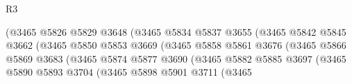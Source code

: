\begin{lexlean}{R3}
\begin{coremodule}
                                                (@3465
                                                  @5826
                                                  @5829
                                                  @3648
                                                  (@3465
                                                    @5834
                                                    @5837
                                                    @3655
                                                    (@3465
                                                      @5842
                                                      @5845
                                                      @3662
                                                      (@3465
                                                        @5850
                                                        @5853
                                                        @3669
                                                        (@3465
                                                          @5858
                                                          @5861
                                                          @3676
                                                          (@3465
                                                            @5866
                                                            @5869
                                                            @3683
                                                            (@3465
                                                              @5874
                                                              @5877
                                                              @3690
                                                              (@3465
                                                                @5882
                                                                @5885
                                                                @3697
                                                                (@3465
                                                                  @5890
                                                                  @5893
                                                                  @3704
                                                                  (@3465
                                                                    @5898
                                                                    @5901
                                                                    @3711
                                                                    (@3465

\end{coremodule}
\end{lexlean}
